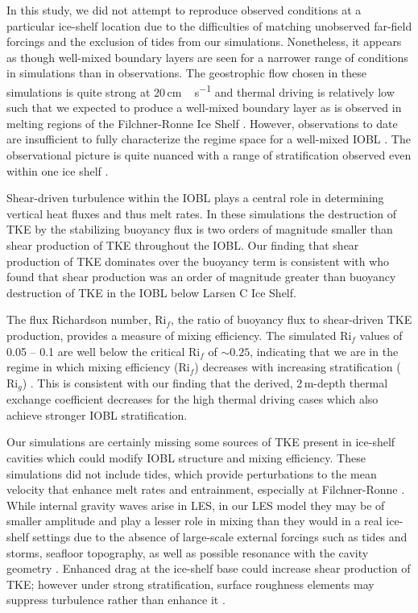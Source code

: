 \documentclass[tc, manuscript]{copernicus}
\begin{document}
In this study, we did not attempt to reproduce observed conditions at a particular ice-shelf location due to the difficulties of matching unobserved far-field forcings and the exclusion of tides from our simulations. Nonetheless, it appears as though well-mixed boundary layers are seen for a narrower range of conditions in simulations than in observations. The geostrophic flow chosen in these simulations is quite strong at 20\,\unit{cm\,s^{-1}} and thermal driving is relatively low such that we expected to produce a well-mixed boundary layer as is observed in melting regions of the Filchner-Ronne Ice Shelf \citep{nicholls_oceanographic_2001}. However, observations to date are insufficient to fully characterize the regime space for a well-mixed IOBL \citep{malyarenko_synthesis_2020}. The observational picture is quite nuanced with a range of stratification observed even within one ice shelf \citep{hattermann_two_2012}. 

Shear-driven turbulence within the IOBL plays a central role in determining vertical heat fluxes and thus melt rates. In these simulations the destruction of TKE by the stabilizing buoyancy flux is two orders of magnitude smaller than shear production of TKE throughout the IOBL. Our finding that shear production of TKE dominates over the buoyancy term is consistent with \citet{davis_turbulence_2019} who found that shear production was an order of magnitude greater than buoyancy destruction of TKE in the IOBL below Larsen C Ice Shelf. 

The flux Richardson number, $\text{Ri}_f$, the ratio of buoyancy flux to shear-driven TKE production, provides a measure of mixing efficiency. The simulated $\text{Ri}_f$ values of 0.05 -- 0.1 are well below the critical $\text{Ri}_f$ of $\sim\!0.25$, indicating that we are in the regime in which mixing efficiency ($\text{Ri}_f$) decreases with increasing stratification ($\text{Ri}_g$) \citep{armenio_investigation_2002, peltier_mixing_2003}. This is consistent with our finding that the derived, 2\,\unit{m}-depth thermal exchange coefficient decreases for the high thermal driving cases which also achieve stronger IOBL stratification.

Our simulations are certainly missing some sources of TKE present in ice-shelf cavities which could modify IOBL structure and mixing efficiency. These simulations did not include tides, which provide perturbations to the mean velocity that enhance melt rates and entrainment, especially at Filchner-Ronne \citep{makinson_modeling_1999, makinson_influence_2011, mueller_tidal_2018}. While internal gravity waves arise in LES, in our LES model they may be of smaller amplitude and play a lesser role in mixing than they would in a real ice-shelf settings due to the absence of large-scale external forcings such as tides and storms, seafloor topography, as well as possible resonance with the cavity geometry \citep{gwyther_cold_2020, mueller_impact_2012, padman_ocean_2018, robertson_tidally_2013}. Enhanced drag at the ice-shelf base could increase shear production of TKE; however under strong stratification, surface roughness elements may suppress turbulence rather than enhance it \citep{ohya_wind-tunnel_2001}. 
\end{document}
